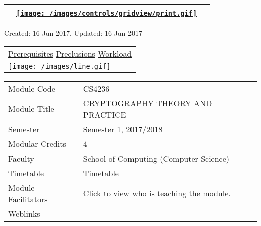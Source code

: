 \hypertarget{ctl00_ctl00_ContentPlaceHolder1_ContentPlaceHolder1_UP}{}
\hypertarget{contentstart}{}
\hypertarget{ctl00_ctl00_ContentPlaceHolder1_ContentPlaceHolder1_pnlMain}{}
\begin{longtable}[]{@{}ll@{}}
\toprule
&
{\href{javascript:PrintThisPage();}{\texttt{[image: /images/controls/gridview/print.gif]}}~~}\tabularnewline
\bottomrule
\end{longtable}

\protect\hypertarget{ctl00_ctl00_ContentPlaceHolder1_ContentPlaceHolder1_LV_UpdateInfo_ctrl0_txtDate}{}{Created:
16-Jun-2017, Updated: 16-Jun-2017}

\begin{longtable}[]{@{}l@{}}
\toprule
\protect\hypertarget{ctl00_ctl00_ContentPlaceHolder1_ContentPlaceHolder1_lblSectionTop}{}{\protect\hyperlink{Prerequisites}{Prerequisites}
\textbar{} \protect\hyperlink{Preclusions}{Preclusions} \textbar{}
\protect\hyperlink{Workload}{Workload}}\tabularnewline
\texttt{[image: /images/line.gif]}\tabularnewline
\bottomrule
\end{longtable}

\hypertarget{ctl00_ctl00_ContentPlaceHolder1_ContentPlaceHolder1_LV_itemPlaceholderContainer}{}
\begin{longtable}[]{@{}ll@{}}
\toprule
\protect\hypertarget{ctl00_ctl00_ContentPlaceHolder1_ContentPlaceHolder1_LV_ctrl0_txtCode}{}{Module
Code} &
\protect\hypertarget{ctl00_ctl00_ContentPlaceHolder1_ContentPlaceHolder1_LV_ctrl0_lcCode}{}{CS4236}\tabularnewline
\protect\hypertarget{ctl00_ctl00_ContentPlaceHolder1_ContentPlaceHolder1_LV_ctrl0_lcCourse}{}{Module
Title} &
\protect\hypertarget{ctl00_ctl00_ContentPlaceHolder1_ContentPlaceHolder1_LV_ctrl0_lcCourseName}{}{CRYPTOGRAPHY
THEORY AND PRACTICE}\tabularnewline
\protect\hypertarget{ctl00_ctl00_ContentPlaceHolder1_ContentPlaceHolder1_LV_ctrl0_lcSemester}{}{Semester}
&
\protect\hypertarget{ctl00_ctl00_ContentPlaceHolder1_ContentPlaceHolder1_LV_ctrl0_lcSem}{}{Semester
1, 2017/2018}\tabularnewline
\protect\hypertarget{ctl00_ctl00_ContentPlaceHolder1_ContentPlaceHolder1_LV_ctrl0_lcModCredit}{}{Modular
Credits} &
\protect\hypertarget{ctl00_ctl00_ContentPlaceHolder1_ContentPlaceHolder1_LV_ctrl0_lcModC}{}{4}\tabularnewline
\protect\hypertarget{ctl00_ctl00_ContentPlaceHolder1_ContentPlaceHolder1_LV_ctrl0_lcFaculty}{}{Faculty}
&
\protect\hypertarget{ctl00_ctl00_ContentPlaceHolder1_ContentPlaceHolder1_LV_ctrl0_lcFac}{}{School
of Computing (Computer Science)}\tabularnewline
\protect\hypertarget{ctl00_ctl00_ContentPlaceHolder1_ContentPlaceHolder1_LV_ctrl0_Label1}{}{Timetable}
&
\protect\hypertarget{ctl00_ctl00_ContentPlaceHolder1_ContentPlaceHolder1_LV_ctrl0_Span1}{}{\href{javascript:void(0);}{Timetable}}\tabularnewline
\protect\hypertarget{ctl00_ctl00_ContentPlaceHolder1_ContentPlaceHolder1_LV_ctrl0_Label6}{}{Module
Facilitators} &
\protect\hypertarget{ctl00_ctl00_ContentPlaceHolder1_ContentPlaceHolder1_LV_ctrl0_Span2}{}{\href{list_lecturers.aspx?CourseID=437bde8c-ff59-4ec7-9090-72689bf9434b\&ClickFrom=}{Click}
to view who is teaching the module.}\tabularnewline
\protect\hypertarget{ctl00_ctl00_ContentPlaceHolder1_ContentPlaceHolder1_LV_ctrl0_LabelCtrl1}{}{Weblinks}
&\tabularnewline
\bottomrule
\end{longtable}

